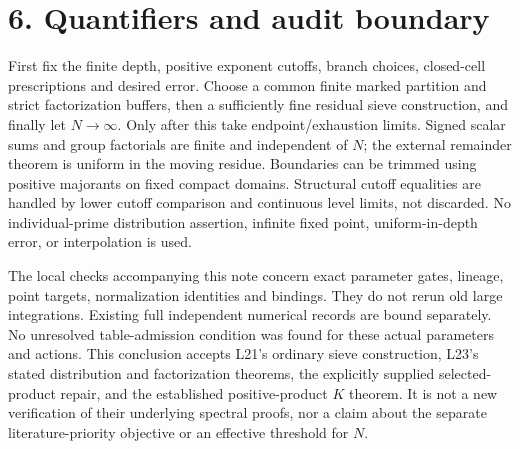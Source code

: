 \documentclass[11pt]{article}
\begin{document}
\section*{6. Quantifiers and audit boundary}
First fix the finite depth, positive exponent cutoffs, branch choices,
closed-cell prescriptions and desired error. Choose a common finite
marked partition and strict factorization buffers, then a sufficiently
fine residual sieve construction, and finally let $N\to\infty$.
Only after this take endpoint/exhaustion limits. Signed scalar sums
and group factorials are finite and independent of $N$; the external
remainder theorem is uniform in the moving residue. Boundaries can be
trimmed using positive majorants on fixed compact domains. Structural
cutoff equalities are handled by lower cutoff comparison and continuous
level limits, not discarded. No individual-prime distribution assertion,
infinite fixed point, uniform-in-depth error, or interpolation is used.

The local checks accompanying this note concern exact parameter gates,
lineage, point targets, normalization identities and bindings. They do
not rerun old large integrations. Existing full independent numerical
records are bound separately. No unresolved table-admission condition
was found for these actual parameters and actions. This conclusion
accepts L21's ordinary sieve construction, L23's stated distribution
and factorization theorems, the explicitly supplied selected-product
repair, and the established positive-product $K$ theorem. It is not a
new verification of their underlying spectral proofs, nor a claim about
the separate literature-priority objective or an effective threshold
for $N$.
\end{document}
